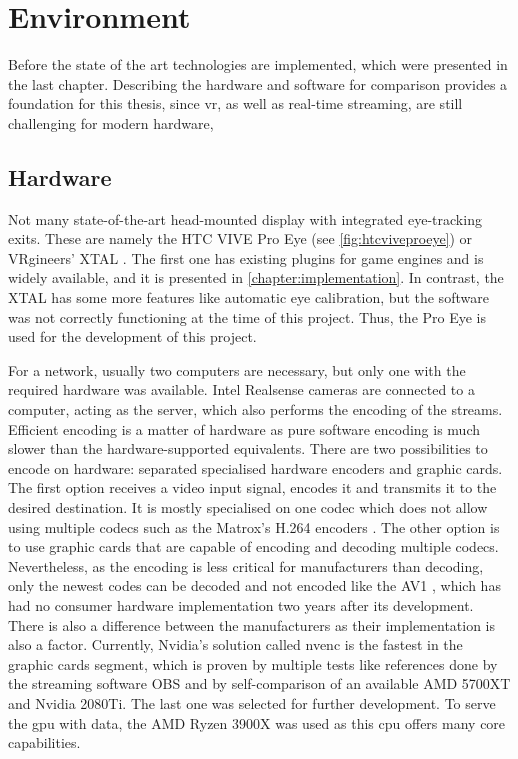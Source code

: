 \chapter{Environment}\label{chapter:environment}
Before the state of the art technologies are implemented, which were presented in the last chapter. Describing the hardware and software for comparison provides a foundation for this thesis, since \gls{vr}, as well as real-time streaming, are still challenging for modern hardware,

\section{Hardware}\label{section:hardware}
Not many state-of-the-art head-mounted display with integrated eye-tracking exits. These are namely the HTC VIVE Pro Eye (see \autoref{fig:htcviveproeye}) or VRgineers’ XTAL \parencite{XTAL2020}. The first one has existing plugins for game engines and is widely available, and it is presented in \autoref{chapter:implementation}. In contrast, the XTAL has some more features like automatic eye calibration, but the software was not correctly functioning at the time of this project. Thus, the Pro Eye is used for the development of this project.
\par
For a network, usually two computers are necessary, but only one with the required hardware was available. Intel Realsense cameras are connected to a computer, acting as the server, which also performs the encoding of the streams. Efficient encoding is a matter of hardware as pure software encoding is much slower than the hardware-supported equivalents. There are two possibilities to encode on hardware: separated specialised hardware encoders and graphic cards. The first option receives a video input signal, encodes it and transmits it to the desired destination. It is mostly specialised on one codec which does not allow using multiple codecs such as the Matrox's H.264 encoders \parencite{Matrox2020}. The other option is to use graphic cards that are capable of encoding and decoding multiple codecs. Nevertheless, as the encoding is less critical for manufacturers than decoding, only the newest codes can be decoded and not encoded like the AV1 \parencite{AO2020}, which has had no consumer hardware implementation two years after its development. There is also a difference between the manufacturers as their implementation is also a factor. Currently, Nvidia’s solution called \gls{nvenc} is the fastest in the graphic cards segment, which is proven by multiple tests like references done by the streaming software OBS \parencite{OBS2020} and by self-comparison of an available AMD 5700XT and Nvidia 2080Ti. The last one was selected for further development. To serve the \gls{gpu} with data, the AMD Ryzen 3900X was used as this \gls{cpu} offers many core capabilities.

